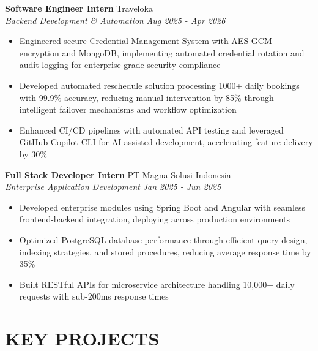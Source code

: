 \documentclass[10pt,a4paper]{article}
\newcommand{\experienceheader}[4]{
    \textbf{#1} \hfill #2 \\
    \textit{#3} \hfill \textit{#4}
}
\begin{document}
\experienceheader{Software Engineer Intern}{Traveloka}{Backend Development \& Automation}{Aug 2025 - Apr 2026}
\begin{itemize}[leftmargin=*, itemsep=1pt, topsep=1pt]
    \item Engineered secure Credential Management System with AES-GCM encryption and MongoDB, implementing automated credential rotation and audit logging for enterprise-grade security compliance
    \item Developed automated reschedule solution processing 1000+ daily bookings with 99.9\% accuracy, reducing manual intervention by 85\% through intelligent failover mechanisms and workflow optimization
    \item Enhanced CI/CD pipelines with automated API testing and leveraged GitHub Copilot CLI for AI-assisted development, accelerating feature delivery by 30\%
\end{itemize}

\experienceheader{Full Stack Developer Intern}{PT Magna Solusi Indonesia}{Enterprise Application Development}{Jan 2025 - Jun 2025}
\begin{itemize}[leftmargin=*, itemsep=1pt, topsep=1pt]
    \item Developed enterprise modules using Spring Boot and Angular with seamless frontend-backend integration, deploying across production environments
    \item Optimized PostgreSQL database performance through efficient query design, indexing strategies, and stored procedures, reducing average response time by 35\%
    \item Built RESTful APIs for microservice architecture handling 10,000+ daily requests with sub-200ms response times
\end{itemize}


\section*{KEY PROJECTS}
\end{document}
